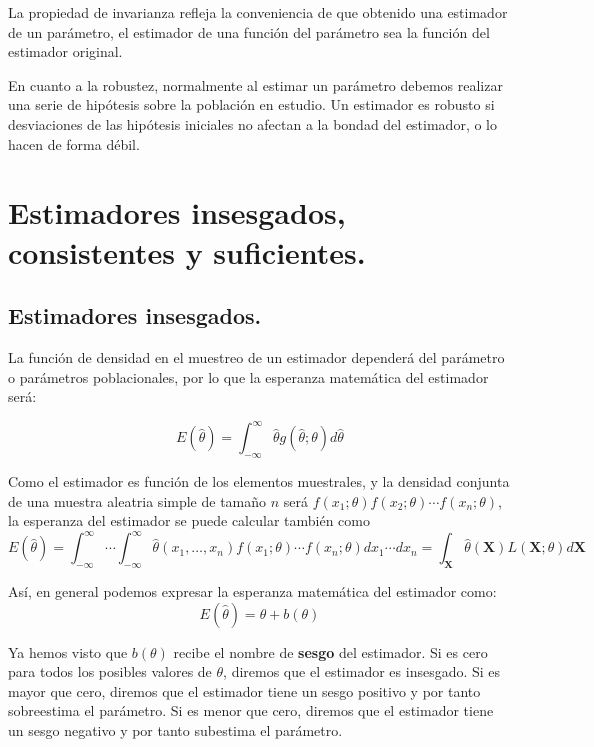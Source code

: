 La propiedad de invarianza refleja la conveniencia de que obtenido una estimador de un par\'ametro, el estimador de una funci\'on del par\'ametro sea la funci\'on del estimador original.

En cuanto a la robustez, normalmente al estimar un par\'ametro debemos realizar una serie de hip\'otesis sobre la poblaci\'on en estudio. Un estimador es robusto si desviaciones de las hip\'otesis iniciales no afectan a la bondad del estimador, o lo hacen de forma d\'ebil.

\section{Estimadores insesgados, consistentes y suficientes.}

\subsection{Estimadores insesgados.}

La funci\'on de densidad en el muestreo de un estimador depender\'a del par\'ametro o par\'ametros poblacionales, por lo que la esperanza matem\'atica del estimador ser\'a:

\begin{equation*}
E(\hat{\theta})=\int_{-\infty}^{\infty}\hat{\theta}g(\hat{\theta};\theta)d\hat{\theta}
\end{equation*}

Como el estimador es funci\'on de los elementos muestrales, y la densidad conjunta de una muestra aleatria simple de tama\~no $n$ ser\'a $f(x_1;\theta)f(x_2;\theta)\cdots f(x_n;\theta)$, la esperanza del estimador se puede calcular tambi\'en como
\begin{equation*}
E(\hat{\theta})=\int_{-\infty}^{\infty}\cdots\int_{-\infty}^{\infty}\hat{\theta}(x_1,\ldots,x_n)f(x_1;\theta)\cdots f(x_n;\theta)dx_1\cdots dx_n=\int_{\boldsymbol{X}}\hat{\theta}(\boldsymbol{X})L(\boldsymbol{X};\theta)d\boldsymbol{X}
\end{equation*}

As\'i, en general podemos expresar la esperanza matem\'atica del estimador como:
\begin{equation*}
E(\hat{\theta})=\theta + b(\theta)
\end{equation*}

Ya hemos visto que $ b(\theta)$ recibe el nombre de \textbf{sesgo} del estimador. Si es cero para todos los posibles valores de $\theta$, diremos que el estimador es insesgado. Si es mayor que cero, diremos que el estimador tiene un sesgo positivo y por tanto sobreestima el par\'ametro. Si es menor que cero, diremos que el estimador tiene un sesgo negativo y por tanto subestima el par\'ametro.

